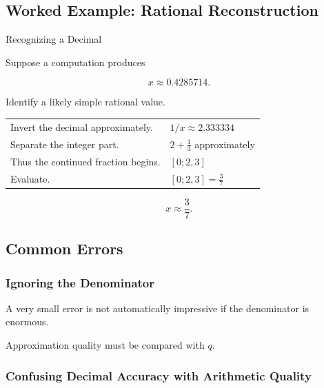 \subsection{Worked Example: Rational Reconstruction}
\label{subsec:worked-rational-reconstruction}

\begin{workedexamplebox}{Recognizing a Decimal}

Suppose a computation produces

\[ x\approx0.4285714. \]

Identify a likely simple rational value.

\begin{tabularx}{\textwidth}{@{}>{\raggedright\arraybackslash}p{}X@{}}
Invert the decimal approximately. & \(1/x\approx2.333334\)\\
Separate the integer part. & \(2+\frac13\) approximately\\
Thus the continued fraction begins. & \([0;2,3]\)\\
Evaluate. & \([0;2,3]=\frac37\)
\end{tabularx}

\begin{answerbox}
\[ \boxed{x\approx\frac37.} \]
\end{answerbox}
\end{workedexamplebox}

\subsection{Common Errors}
\label{subsec:diophantine-approximation-common-errors}

\subsubsection{Ignoring the Denominator}

A very small error is not automatically impressive if the denominator is
enormous.

Approximation quality must be compared with \(q\).

\subsubsection{Confusing Decimal Accuracy with Arithmetic Quality}

